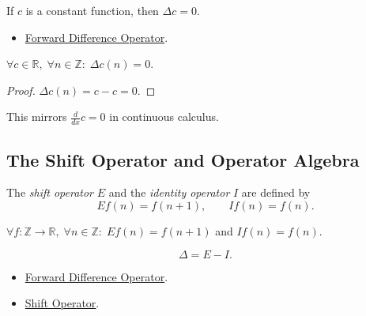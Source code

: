 \begin{proposition}
\label{prop:delta-constant}
If \(c\) is a constant function, then \(\Delta c = 0\).
\end{proposition}

\begin{dependencies}
\begin{itemize}
  \item \hyperref[def:forward-difference]{Forward Difference Operator}.
\end{itemize}
\end{dependencies}

\begin{remark*}
\(\forall c \in \mathbb{R},\; \forall n \in \mathbb{Z}:\; \Delta c(n) = 0\).
\end{remark*}

\begin{proof}
\(\Delta c(n) = c - c = 0\).
\end{proof}

\begin{remark*}[Analogy]
This mirrors \(\tfrac{d}{dx} c = 0\) in continuous calculus.
\end{remark*}

\subsection*{The Shift Operator and Operator Algebra}

\begin{definition}
\label{def:shift-operator}
The \emph{shift operator} \(E\) and the \emph{identity operator} \(I\)
are defined by
\[
Ef(n) = f(n+1), \qquad If(n) = f(n).
\]
\end{definition}

\NoLocalDependencies

\begin{remark*}
\(\forall f : \mathbb{Z}\to\mathbb{R},\; \forall n \in \mathbb{Z}:\;
Ef(n) = f(n+1)\) and \(If(n) = f(n)\).
\end{remark*}

\begin{theorem}[\(\Delta = E - I\)]
\label{thm:delta-E-minus-I}
\[
\Delta = E - I.
\]
\end{theorem}

\begin{dependencies}
\begin{itemize}
  \item \hyperref[def:forward-difference]{Forward Difference Operator}.
  \item \hyperref[def:shift-operator]{Shift Operator}.
\end{itemize}
\end{dependencies}

